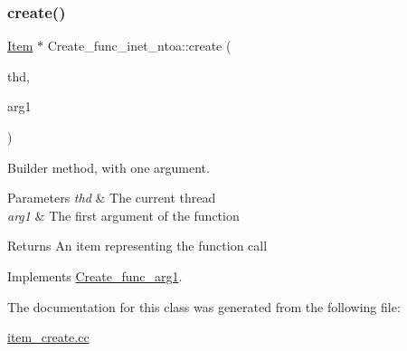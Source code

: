 \subsubsection{\texorpdfstring{create()}{create()}}
{\footnotesize\ttfamily \mbox{\hyperlink{classItem}{Item}} $\ast$ Create\+\_\+func\+\_\+inet\+\_\+ntoa\+::create (\begin{DoxyParamCaption}\item[{T\+HD $\ast$}]{thd,  }\item[{\mbox{\hyperlink{classItem}{Item}} $\ast$}]{arg1 }\end{DoxyParamCaption})\hspace{0.3cm}{\ttfamily [virtual]}}

Builder method, with one argument. 
\begin{DoxyParams}{Parameters}
{\em thd} & The current thread \\
\hline
{\em arg1} & The first argument of the function \\
\hline
\end{DoxyParams}
\begin{DoxyReturn}{Returns}
An item representing the function call 
\end{DoxyReturn}


Implements \mbox{\hyperlink{classCreate__func__arg1_a3e9a98f755cd82c3e762e334c955a8c9}{Create\+\_\+func\+\_\+arg1}}.



The documentation for this class was generated from the following file\+:\begin{DoxyCompactItemize}
\item 
\mbox{\hyperlink{item__create_8cc}{item\+\_\+create.\+cc}}\end{DoxyCompactItemize}
